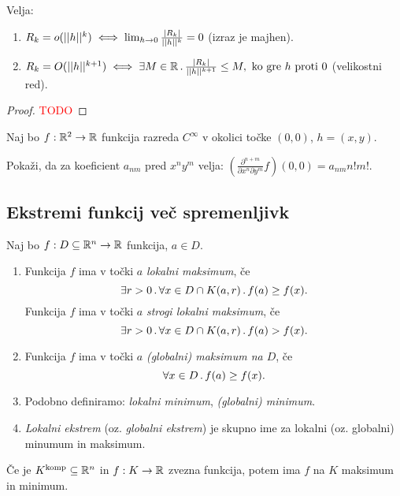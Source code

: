 \begin{opomba}
    Velja:
    \begin{enumerate}
        \item $R_k = o(||h||^k) \iff \lim_{h \to 0} \frac{|R_k|}{||h||^k} = 0$ (izraz je majhen).
        \item $R_k = O(||h||^{k+1}) \iff \exists M \in \mathbb{R} \,.\, \frac{|R_k|}{||h||^{k+1}} \leq M, \text{ ko gre } h \text{ proti } 0$ (velikostni red).
    \end{enumerate}
\end{opomba}

\begin{proof}
    \textcolor{red}{TODO}
\end{proof}

\begin{opomba}
    Naj bo $f: \mathbb{R}^2 \to \mathbb{R}$ funkcija razreda $C^\infty$ v okolici točke $(0,0)$, $h = (x, y)$. 
    
    Pokaži, da za koeficient $a_{nm}$ pred $x^ny^m$ velja: $(\frac{\partial^{n+m}}{\partial x^n \partial y^m} f)(0,0) = a_{nm} n!m!$. 
\end{opomba}

\newpage
\subsection{Ekstremi funkcij več spremenljivk}
\begin{definicija}
    Naj bo $f: D \subseteq \mathbb{R}^n \to \mathbb{R}$ funkcija, $a \in D$.
    \begin{enumerate}
        \item Funkcija $f$ ima v točki $a$ \emph{lokalni maksimum}, če 
        $$\exists r>0 \,.\, \forall x \in D \cap K(a,r) \,.\, f(a) \geq f(x).$$ 
        Funkcija $f$ ima v točki $a$ \emph{strogi lokalni maksimum}, če
        $$\exists r>0 \,.\, \forall x \in D \cap K(a,r) \,.\, f(a) > f(x).$$ 
        \item Funkcija $f$ ima v točki $a$ \emph{(globalni) maksimum na $D$}, če 
        $$\forall x \in D \,.\, f(a) \geq f(x).$$
        \item Podobno definiramo: \emph{lokalni minimum}, \emph{(globalni) minimum}.
        \item \emph{Lokalni ekstrem} (oz. \emph{globalni ekstrem}) je skupno ime za lokalni (oz. globalni) minumum in maksimum.
    \end{enumerate}
\end{definicija}

\begin{opomba}
    Če je $K^\text{komp} \subseteq \mathbb{R}^n$ in $f: K \to \mathbb{R}$ zvezna funkcija, potem ima $f$ na $K$ maksimum in minimum.
\end{opomba}

